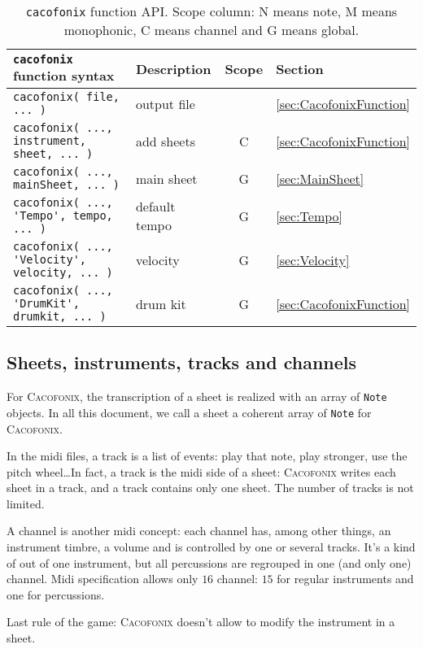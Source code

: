 \documentclass{article}
\newcommand\cacofonix{\textsc{Cacofonix}\xspace}
\begin{document}
\begin{table}
	\centering
	\begin{tabular}{llcl}
		\lstinline!cacofonix! function syntax & Description & Scope & Section \\
		\hline
		\lstinline!cacofonix( file, ... )! & output file & & \ref{sec:CacofonixFunction} \\
		\lstinline!cacofonix( ..., instrument, sheet, ... )! & add sheets & C & \ref{sec:CacofonixFunction} \\
		\lstinline!cacofonix( ..., mainSheet, ... )! & main sheet & G & \ref{sec:MainSheet} \\
		\lstinline!cacofonix( ..., 'Tempo', tempo, ... )! & default tempo & G & \ref{sec:Tempo} \\
		\lstinline!cacofonix( ..., 'Velocity', velocity, ... )! & velocity & G & \ref{sec:Velocity} \\
		\lstinline!cacofonix( ..., 'DrumKit', drumkit, ... )! & drum kit & G & \ref{sec:CacofonixFunction} \\
	\end{tabular}
	\caption[\lstinline!cacofonix! function API]{\lstinline!cacofonix! function API. Scope column: N means note, M means monophonic, C means channel and G means global.}
	\label{tab:CacofonixAPI}
\end{table}

\subsection{Sheets, instruments, tracks and channels}

For \cacofonix, the transcription of a sheet is realized with an array of \lstinline!Note! objects. In all this document, we call a sheet a coherent array of \lstinline!Note! for \cacofonix.

In the midi files, a track is a list of events: play that note, play stronger, use the pitch wheel\dots In fact, a track is the midi side of a sheet: \cacofonix writes each sheet in a track, and a track contains only one sheet. The number of tracks is not limited.

A channel is another midi concept: each channel has, among other things, an instrument timbre, a volume and is controlled by one or several tracks. It's a kind of out of one instrument, but all percussions are regrouped in one (and only one) channel. Midi specification allows only $16$ channel: $15$ for regular instruments and one for percussions.

Last rule of the game: \cacofonix doesn't allow to modify the instrument in a sheet.
\end{document}
